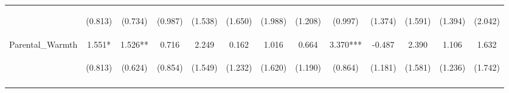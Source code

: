 \begin{tabular}{lcccccccccccc}
 & \begin{footnotesize}(0.813)\end{footnotesize} & \begin{footnotesize}(0.734)\end{footnotesize} & \begin{footnotesize}(0.987)\end{footnotesize} & \begin{footnotesize}(1.538)\end{footnotesize} & \begin{footnotesize}(1.650)\end{footnotesize} & \begin{footnotesize}(1.988)\end{footnotesize} & \begin{footnotesize}(1.208)\end{footnotesize} & \begin{footnotesize}(0.997)\end{footnotesize} & \begin{footnotesize}(1.374)\end{footnotesize} & \begin{footnotesize}(1.591)\end{footnotesize} & \begin{footnotesize}(1.394)\end{footnotesize} & \begin{footnotesize}(2.042)\end{footnotesize}\\
\noalign{\smallskip}Parental_Warmth & 1.551* & 1.526** & 0.716 & 2.249 & 0.162 & 1.016 & 0.664 & 3.370*** & -0.487 & 2.390 & 1.106 & 1.632\\
 & \begin{footnotesize}(0.813)\end{footnotesize} & \begin{footnotesize}(0.624)\end{footnotesize} & \begin{footnotesize}(0.854)\end{footnotesize} & \begin{footnotesize}(1.549)\end{footnotesize} & \begin{footnotesize}(1.232)\end{footnotesize} & \begin{footnotesize}(1.620)\end{footnotesize} & \begin{footnotesize}(1.190)\end{footnotesize} & \begin{footnotesize}(0.864)\end{footnotesize} & \begin{footnotesize}(1.181)\end{footnotesize} & \begin{footnotesize}(1.581)\end{footnotesize} & \begin{footnotesize}(1.236)\end{footnotesize} & \begin{footnotesize}(1.742)\end{footnotesize}\\
\noalign{\smallskip}\hline\end{tabular}\\
